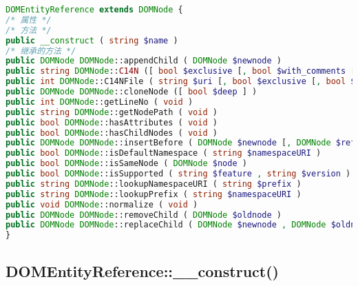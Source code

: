 \begin{lstlisting}[language=PHP]
DOMEntityReference extends DOMNode {
/* 属性 */
/* 方法 */
public __construct ( string $name )
/* 继承的方法 */
public DOMNode DOMNode::appendChild ( DOMNode $newnode )
public string DOMNode::C14N ([ bool $exclusive [, bool $with_comments [, array $xpath [, array $ns_prefixes ]]]] )
public int DOMNode::C14NFile ( string $uri [, bool $exclusive [, bool $with_comments [, array $xpath [, array $ns_prefixes ]]]] )
public DOMNode DOMNode::cloneNode ([ bool $deep ] )
public int DOMNode::getLineNo ( void )
public string DOMNode::getNodePath ( void )
public bool DOMNode::hasAttributes ( void )
public bool DOMNode::hasChildNodes ( void )
public DOMNode DOMNode::insertBefore ( DOMNode $newnode [, DOMNode $refnode ] )
public bool DOMNode::isDefaultNamespace ( string $namespaceURI )
public bool DOMNode::isSameNode ( DOMNode $node )
public bool DOMNode::isSupported ( string $feature , string $version )
public string DOMNode::lookupNamespaceURI ( string $prefix )
public string DOMNode::lookupPrefix ( string $namespaceURI )
public void DOMNode::normalize ( void )
public DOMNode DOMNode::removeChild ( DOMNode $oldnode )
public DOMNode DOMNode::replaceChild ( DOMNode $newnode , DOMNode $oldnode )
}
\end{lstlisting}


\subsection{DOMEntityReference::\_\_construct()}

\begin{lstlisting}[language=PHP]

\end{lstlisting}


\begin{lstlisting}[language=PHP]

\end{lstlisting}


\begin{lstlisting}[language=PHP]

\end{lstlisting}


\begin{lstlisting}[language=PHP]

\end{lstlisting}


\begin{lstlisting}[language=PHP]

\end{lstlisting}
